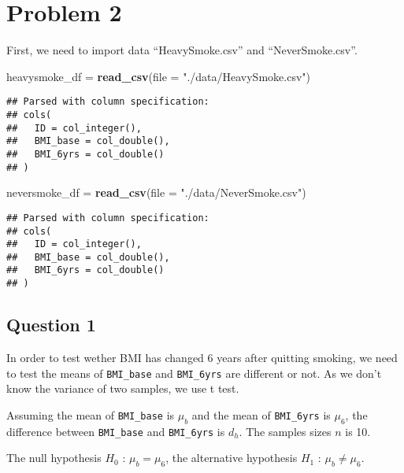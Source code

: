 \documentclass[]{article}
\newenvironment{Shaded}{\begin{snugshade}}{\end{snugshade}}
\newcommand{\KeywordTok}[1]{\textcolor[rgb]{0.13,0.29,0.53}{\textbf{#1}}}
\newcommand{\DataTypeTok}[1]{\textcolor[rgb]{0.13,0.29,0.53}{#1}}
\newcommand{\StringTok}[1]{\textcolor[rgb]{0.31,0.60,0.02}{#1}}
\newcommand{\NormalTok}[1]{#1}
\begin{document}
\section{Problem 2}\label{problem-2}

First, we need to import data ``HeavySmoke.csv'' and ``NeverSmoke.csv''.

\begin{Shaded}
\begin{Highlighting}[]
\NormalTok{heavysmoke_df =}\StringTok{ }\KeywordTok{read_csv}\NormalTok{(}\DataTypeTok{file =} \StringTok{"./data/HeavySmoke.csv"}\NormalTok{)}
\end{Highlighting}
\end{Shaded}

\begin{verbatim}
## Parsed with column specification:
## cols(
##   ID = col_integer(),
##   BMI_base = col_double(),
##   BMI_6yrs = col_double()
## )
\end{verbatim}

\begin{Shaded}
\begin{Highlighting}[]
\NormalTok{neversmoke_df =}\StringTok{ }\KeywordTok{read_csv}\NormalTok{(}\DataTypeTok{file =} \StringTok{"./data/NeverSmoke.csv"}\NormalTok{)}
\end{Highlighting}
\end{Shaded}

\begin{verbatim}
## Parsed with column specification:
## cols(
##   ID = col_integer(),
##   BMI_base = col_double(),
##   BMI_6yrs = col_double()
## )
\end{verbatim}

\subsection{Question 1}\label{question-1-1}

In order to test wether BMI has changed 6 years after quitting smoking,
we need to test the means of \texttt{BMI\_base} and \texttt{BMI\_6yrs}
are different or not. As we don't know the variance of two samples, we
use t test.

Assuming the mean of \texttt{BMI\_base} is \(\mu_b\) and the mean of
\texttt{BMI\_6yrs} is \(\mu_6\), the difference between
\texttt{BMI\_base} and \texttt{BMI\_6yrs} is \(d_h\). The samples sizes
\(n\) is 10.

The null hypothesis \(H_0\) : \(\mu_b = \mu_6\), the alternative
hypothesis \(H_1\) : \(\mu_b \neq \mu_6\).
\end{document}
